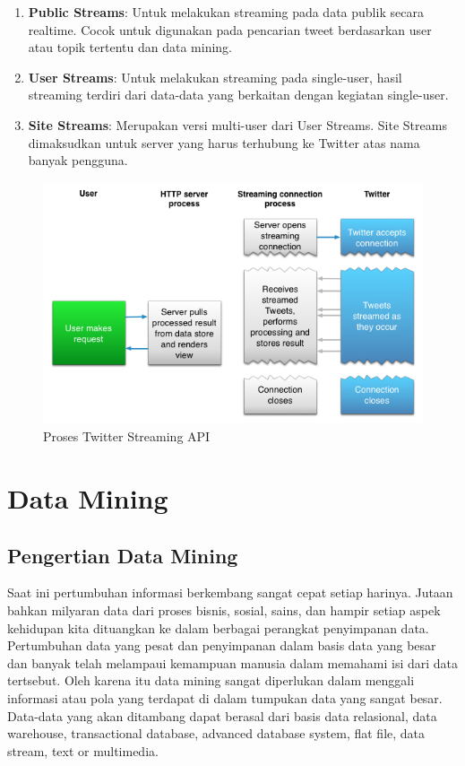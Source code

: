 \begin{enumerate}
	\item \textbf{Public Streams}: Untuk melakukan streaming pada data publik secara realtime. Cocok untuk digunakan pada pencarian tweet berdasarkan user atau topik tertentu dan data mining.
	\item \textbf{User Streams}: Untuk melakukan streaming pada single-user, hasil streaming terdiri dari data-data yang berkaitan dengan kegiatan single-user.
	\item	\textbf{Site Streams}: Merupakan versi multi-user dari User Streams. Site Streams dimaksudkan untuk server yang harus terhubung ke Twitter atas nama banyak pengguna.
\end{enumerate}

\begin{figure}
\centering
\includegraphics[scale=0.5]{Gambar/streaming-intro-2_1.png}
\caption[Proses Twitter Streaming API]{Proses Twitter Streaming API \cite{TwitterApi:2015}} 
\end{figure}

\section{Data Mining}
\label{sec:data_mining}
\subsection{Pengertian Data Mining}
Saat ini pertumbuhan informasi berkembang sangat cepat setiap harinya. Jutaan bahkan milyaran data dari proses bisnis, sosial, sains, dan hampir setiap aspek kehidupan kita dituangkan ke dalam berbagai perangkat penyimpanan data. Pertumbuhan data yang pesat dan penyimpanan dalam basis data yang besar dan banyak telah melampaui kemampuan manusia dalam memahami isi dari data tertsebut. Oleh karena itu data mining sangat diperlukan dalam menggali informasi atau pola yang terdapat di dalam tumpukan data yang sangat besar. Data-data yang akan ditambang dapat berasal dari basis data relasional, data warehouse, transactional database, advanced database system, flat file, data stream, text or multimedia. \cite{han2011data} 

